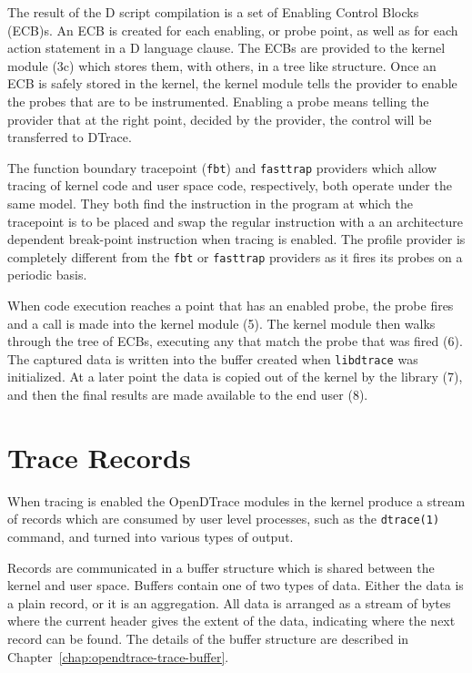 The result of the D script compilation is a set of Enabling Control Blocks
(ECB)s.  An ECB is created for each enabling, or probe point, as well
as for each action statement in a D language clause.
The ECBs are provided to the kernel module (3c) which stores them,
with others, in a tree like structure. Once an ECB is safely stored in
the kernel, the kernel module tells the provider to enable the probes
that are to be instrumented. Enabling a probe means telling the provider
that at the right point, decided by the provider, the control will be
transferred to DTrace.

The function boundary tracepoint (\verb|fbt|) and \verb|fasttrap|
providers which allow tracing of kernel code and user space code,
respectively, both operate under the same model.  They both find the
instruction in the program at which the tracepoint is to be placed and
swap the regular instruction with a an architecture dependent
break-point instruction when tracing is enabled. The profile provider is
completely different from the \verb|fbt| or \verb|fasttrap| providers as
it fires its probes on a periodic basis.

When code execution reaches a point that has an enabled probe, the
probe fires and a call is made into the kernel module (5). The kernel
module then walks through the tree of ECBs, executing any that match
the probe that was fired (6). The captured data is written into the
buffer created when \texttt{libdtrace} was initialized. At a later
point the data is copied out of the kernel by the library (7), and
then the final results are made available to the end user (8).

\section{Trace Records}
\label{sec:trace-records}

When tracing is enabled the OpenDTrace modules in the kernel produce a
stream of records which are consumed by user level processes, such as
the \verb|dtrace(1)| command, and turned into various types of output.

Records are communicated in a buffer structure
which is shared between the kernel and user space.  Buffers contain
one of two types of data.  Either the data is a plain record, or it is
an aggregation.  All data is arranged as a stream of bytes where the
current header gives the extent of the data, indicating where the next
record can be found. The details of the buffer structure are described in
Chapter~\ref{chap:opendtrace-trace-buffer}.

